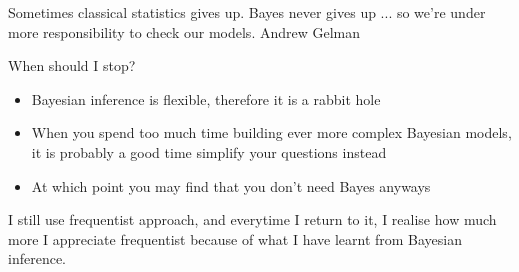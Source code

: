 \documentclass[12pt]{beamer}
\begin{document}
\begin{frame}
Sometimes classical statistics gives up. Bayes never gives up ... so we're under more responsibility to check our models.
Andrew Gelman
\end{frame}

\begin{frame}{When should I stop?}
\begin{itemize}
\item Bayesian inference is flexible, therefore it is a rabbit hole
\item When you spend too much time building ever more complex Bayesian models, it is probably a good time simplify your questions instead
\item At which point you may find that you don't need Bayes anyways
\end{itemize}
\end{frame}

\begin{frame}
I still use frequentist approach, and everytime I return to it, I realise how much more I appreciate frequentist because of what I have learnt from Bayesian inference.
\end{frame}
\end{document}
